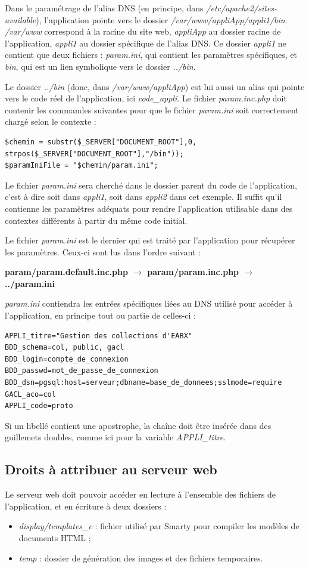 Dans le paramétrage de l’alias DNS (en principe, dans \textit{/etc/apache2/sites-available}), l’application pointe vers le dossier \textit{/var/www/appliApp/appli1/bin}. \textit{/var/www} correspond à la racine du site web, \textit{appliApp} au dossier racine de l’application, \textit{appli1} au dossier spécifique de l’alias DNS. Ce dossier \textit{appli1} ne contient que deux fichiers : \textit{param.ini}, qui contient les paramètres spécifiques, et \textit{bin}, qui est un lien symbolique vers le dossier \textit{../bin}.

Le dossier \textit{../bin} (donc, dans\textit{ /var/www/appliApp}) est lui aussi un alias qui pointe vers le code réel de l’application, ici \textit{code\_appli}. Le fichier \textit{param.inc.php} doit contenir les commandes suivantes pour que le fichier \textit{param.ini} soit correctement chargé selon le contexte :
\begin{lstlisting}
$chemin = substr($_SERVER["DOCUMENT_ROOT"],0, strpos($_SERVER["DOCUMENT_ROOT"],"/bin"));
$paramIniFile = "$chemin/param.ini";
\end{lstlisting}

Le fichier \textit{param.ini} sera cherché dans le dossier parent du code de l’application, c’est à dire soit dans \textit{appli1}, soit dans \textit{appli2} dans cet exemple. Il suffit qu’il contienne les paramètres adéquats pour rendre l’application utilisable dans des contextes différents à partir du même code initial.

Le fichier \textit{param.ini} est le dernier qui est traité par l'application pour récupérer les paramètres. Ceux-ci sont lus dans l'ordre suivant :

\textbf{param/param.default.inc.php $\rightarrow$ param/param.inc.php $\rightarrow$ ../param.ini}

\textit{param.ini} contiendra les entrées spécifiques liées au DNS utilisé pour accéder à l'application, en principe tout ou partie de celles-ci :
\begin{lstlisting}
APPLI_titre="Gestion des collections d'EABX"
BDD_schema=col, public, gacl
BDD_login=compte_de_connexion
BDD_passwd=mot_de_passe_de_connexion
BDD_dsn=pgsql:host=serveur;dbname=base_de_donnees;sslmode=require
GACL_aco=col
APPLI_code=proto
\end{lstlisting}

Si un libellé contient une apostrophe, la chaîne doit être insérée dans des guillemets doubles, comme ici pour la variable \textit{APPLI\_titre}.


\subsection{Droits à attribuer au serveur web}
\label{droitsApache}
Le serveur web doit pouvoir accéder en lecture à l'ensemble des fichiers de l'application, et en écriture à deux dossiers :
\begin{itemize}
\item \textit{display/templates\_c} : fichier utilisé par Smarty pour compiler les modèles de documents HTML ;
\item \textit{temp} : dossier de génération des images et des fichiers temporaires.
\end{itemize}


